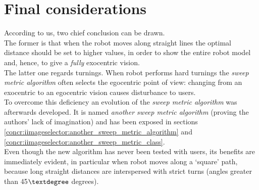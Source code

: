 \section{Final considerations}
\label{performance_evaluation:finalconsiderations}

According to us, two chief conclusion can be drawn.
\\
The former is that when the robot moves along straight lines
the optimal distance should be set to higher values, in order
to show the entire robot model and, hence, to give a \textit{fully}
exocentric vision.
\\
The latter one regards turnings. When robot performs hard turnings
the \textit{sweep metric algorithm} often selects the egocentric
point of view: changing from an exocentric to an egocentric vision
causes disturbance to users.
\\
To overcome this deficiency an evolution of the \textit{sweep metric
algorithm} was afterwards developed. It is named \textit{another sweep
metric algorithm} (proving the authors' lack of imagination) and
has been exposed in sections 
\ref{concr:iimageselector:another_sweep_metric_algorithm} and
\ref{concr:iimageselector:another_sweep_metric_class}.
\\
Even though the new algorithm has never been tested with users, its
benefits are immediately evident, in particular when robot moves
along a `square' path, because long straight distances are interspersed
with strict turns (angles greater than 45$\textdegree$ degrees).
